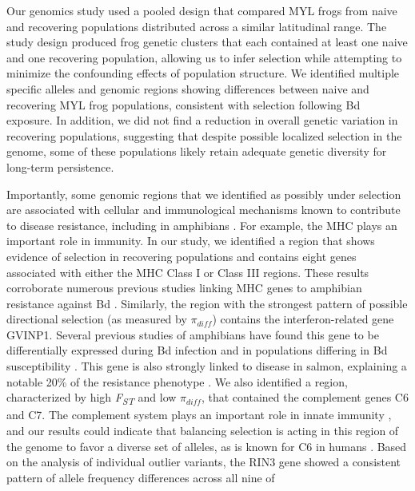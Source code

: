 \documentclass[9pt,twocolumn,twoside,lineno]{pnas-new}
\begin{document}
Our genomics study used a pooled design that compared MYL frogs from
naive and recovering populations distributed across a similar
latitudinal range. The study design produced frog genetic clusters that
each contained at least one naive and one recovering population,
allowing us to infer selection while attempting to minimize the
confounding effects of population structure. We identified multiple
specific alleles and genomic regions showing differences between naive
and recovering MYL frog populations, consistent with selection following
Bd exposure. In addition, we did not find a reduction in overall genetic
variation in recovering populations, suggesting that despite possible
localized selection in the genome, some of these populations likely
retain adequate genetic diversity for long-term persistence.

Importantly, some genomic regions that we identified as possibly under
selection are associated with cellular and immunological mechanisms
known to contribute to disease resistance, including in amphibians
\citep{zamudio2020}. For example, the MHC plays an important role in
immunity. In our study, we identified a region that shows evidence of
selection in recovering populations and contains eight genes associated
with either the MHC Class I or Class III regions. These results
corroborate numerous previous studies linking MHC genes to amphibian
resistance against Bd \citep[e.g.,][]{savage2011, bataille2015}.
Similarly, the region with the strongest pattern of possible directional
selection (as measured by \(\pi_{diff}\)) contains the
interferon-related gene GVINP1. Several previous studies of amphibians
have found this gene to be differentially expressed during Bd infection
\citep[e.g.,][]{grogan2018b, ellison2014} and in populations differing
in Bd susceptibility \citep{grogan2018b}. This gene is also strongly
linked to disease in salmon, explaining a notable 20\% of the resistance
phenotype \citep[i.e., gill damage and amoebic load as heritable host
resistance traits,][]{robledo2020, robledo2018}. We also identified a
region, characterized by high \emph{F\textsubscript{ST}} and low
\(\pi_{diff}\), that contained the complement genes C6 and C7. The
complement system plays an important role in innate immunity
\citep{rieraromo2016}, and our results could indicate that balancing
selection is acting in this region of the genome to favor a diverse set
of alleles, as is known for C6 in humans \citep{soejima2005}. Based on
the analysis of individual outlier variants, the RIN3 gene showed a
consistent pattern of allele frequency differences across all nine of
\end{document}
